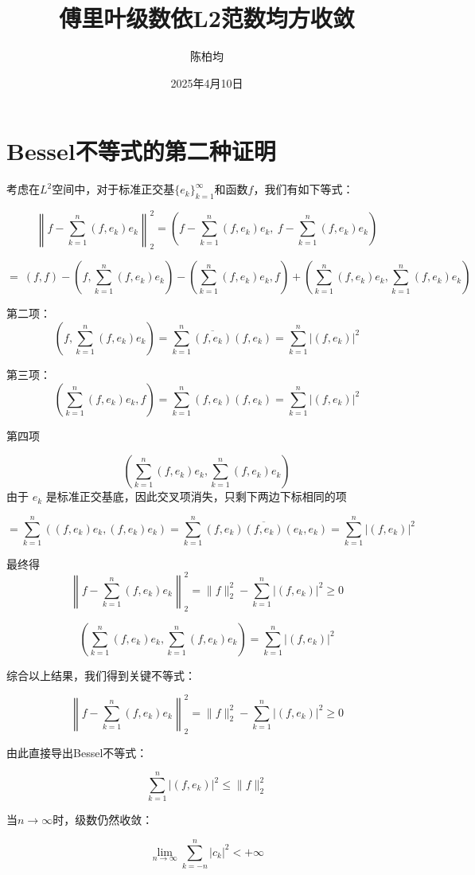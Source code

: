 \documentclass[linespread=1.5]{article}
\title{傅里叶级数依L2范数均方收敛}
\author{陈柏均}
\date{2025年4月10日}
\begin{document}
	\maketitle
	
	
	
	\section{Bessel不等式的第二种证明}
	
	考虑在$L^2$空间中，对于标准正交基$\{e_k\}_{k=1}^\infty$和函数$f$，我们有如下等式：
	
	\[
	\left\| f - \sum_{k=1}^n (f, e_k) e_k \right\|_2^2 = \left( f - \sum_{k=1}^n (f, e_k) e_k,\ f - \sum_{k=1}^n (f, e_k) e_k \right)
	\]

	\[
		= \ (f, f) - \left( f, \sum_{k=1}^n (f, e_k) e_k \right) - \left( \sum_{k=1}^n (f, e_k) e_k, f \right) + \left( \sum_{k=1}^n (f, e_k) e_k, \sum_{k=1}^n (f, e_k) e_k \right)
	\]

	 第二项：
	 \[
	 \left( f, \sum_{k=1}^n (f, e_k) e_k \right) = \sum_{k=1}^n \overline{(f, e_k)} (f, e_k) = \sum_{k=1}^n |(f, e_k)|^2
	 \]
	 
	 第三项：
	 \[
	 \left( \sum_{k=1}^n (f, e_k) e_k, f \right)  = \sum_{k=1}^n (f, e_k) {(f, e_k)} = \sum_{k=1}^n |(f, e_k)|^2
	 \]
		
第四项

\[
\left( \sum_{k=1}^n (f, e_k) e_k, \sum_{k=1}^n (f, e_k) e_k \right)
\]
由于 \(e_k\) 是标准正交基底，因此交叉项消失，只剩下两边下标相同的项

\[
= \sum_{k=1}^n \left( (f, e_k) e_k, (f, e_k) e_k \right) = \sum_{k=1}^n (f, e_k) \overline{(f, e_k)} (e_k, e_k) = \sum_{k=1}^n |(f, e_k)|^2
\]

最终得
\[
\left\| f - \sum_{k=1}^n (f, e_k) e_k \right\|_2^2 = \|f\|_2^2 - \sum_{k=1}^n |(f, e_k)|^2 \geq 0
\]

		\[
		\left( \sum_{k=1}^n (f, e_k) e_k, \sum_{k=1}^n (f, e_k) e_k \right) = \sum_{k=1}^n |(f, e_k)|^2
		\]

	
	综合以上结果，我们得到关键不等式：
	
	\[
	\left\| f - \sum_{k=1}^n (f, e_k) e_k \right\|_2^2 = \|f\|_2^2 - \sum_{k=1}^n |(f, e_k)|^2 \geq 0
	\]
	
	由此直接导出Bessel不等式：
	
	\[
	\sum_{k=1}^n |(f, e_k)|^2 \leq \|f\|_2^2
	\]
	
	当$n \to \infty$时，级数仍然收敛：
	
	\[
	\lim_{n \to \infty} \sum_{k=-n}^n |c_k|^2 < +\infty
	\]
	
\end{document}
